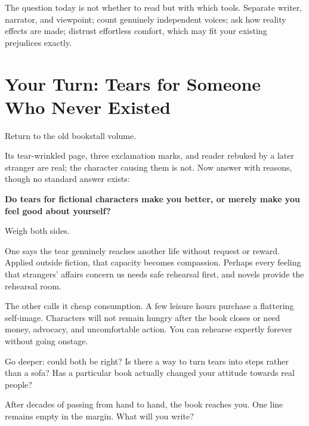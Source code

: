 The question today is not whether to read but with which tools. Separate writer, narrator, and viewpoint; count genuinely independent voices; ask how reality effects are made; distrust effortless comfort, which may fit your existing prejudices exactly.

\section[Your Turn: Tears for Fictional People]{Your Turn: Tears for Someone Who Never Existed}
Return to the old bookstall volume.

Its tear-wrinkled page, three exclamation marks, and reader rebuked by a later stranger are real; the character causing them is not. Now answer with reasons, though no standard answer exists:

\textbf{Do tears for fictional characters make you better, or merely make you feel good about yourself?}

Weigh both sides.

One says the tear genuinely reaches another life without request or reward. Applied outside fiction, that capacity becomes compassion. Perhaps every feeling that strangers' affairs concern us needs safe rehearsal first, and novels provide the rehearsal room.

The other calls it cheap consumption. A few leisure hours purchase a flattering self-image. Characters will not remain hungry after the book closes or need money, advocacy, and uncomfortable action. You can rehearse expertly forever without going onstage.

Go deeper: could both be right? Is there a way to turn tears into steps rather than a sofa? Has a particular book actually changed your attitude towards real people?

After decades of passing from hand to hand, the book reaches you. One line remains empty in the margin. What will you write?
